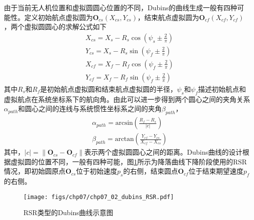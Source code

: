 由于当前无人机位置和虚拟圆圆心位置的不同，Dubins的曲线生成一般有四种可能性。定义初始航点虚拟圆为$\mathbf{O}_{cs}(X_{cs},Y_{cs})$，结束航点虚拟圆为$\mathbf{O}_{cf}(X_{cf}, Y_{cf})$，两个虚拟圆圆心的求解公式如下
\begin{align}
&X_{cs} = X_s - R_s \cos (\psi_s \pm \frac{2}{\pi}) \\
&Y_{cs} = X_s - R_s \sin (\psi_f \pm \frac{2}{\pi}) \\
&X_{cf} = X_f - R_f \cos (\psi_f \pm \frac{2}{\pi}) \\
&Y_{cf} = X_f - R_f \sin (\psi_f \pm \frac{2}{\pi})
\end{align}
其中$R_s$和$R_f$是初始航点虚拟圆和结束航点虚拟圆的半径，$\psi_s$和$\psi_f$描述初始航点和虚拟航点在系统坐标系下的航向角。由此可以进一步得到两个圆心之间的夹角关系$\alpha_{path}$和圆心之间的连线与系统惯性坐标系之间的夹角$\beta_{path}$，
\begin{align}
&\alpha_{path} = \text{arcsin}( \frac{R_f-R_s}{|c|}) \\
&\beta_{path} = \text{arctan} (\frac{Y_{cf}-Y_{cs}}{X_{cf}-X_{cs}})
\end{align}
其中，$|c|= \parallel \mathbf{O}_{cs} - \mathbf{O}_{cf} \parallel $表示两个虚拟圆圆心之间的距离。Dubins曲线的设计根据虚拟圆的位置不同，一般有四种可能，图\ref{fig:chp07_02_dubins_RSR}所示为降落曲线下降阶段使用的$\text{RSR}$情况，即初始圆原点$\mathbf{O}_{cs}$位于初始速度$p_s$的右侧，结束圆点$\mathbf{O}_{cf}$位于结束期望速度$p_f$的右侧。
\begin{figure}[ht]   
	\centering
	\texttt{[image: figs/chp07/chp07\_02\_dubins\_RSR.pdf]}
	\caption{RSR类型的Dubins曲线示意图}
	\label{fig:chp07_02_dubins_RSR}
\end{figure}

